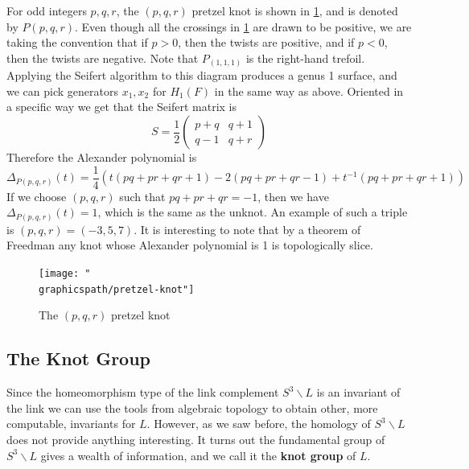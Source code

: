 \begin{example}
For odd integers $p,q,r$, the $(p,q,r)$ pretzel knot is shown in \cref{pretzel-knot}, and is denoted by $P(p,q,r)$. Even though all the crossings in \cref{pretzel-knot} are drawn to be positive, we are taking the convention that if $p>0$, then the twists are positive, and if $p<0$, then the twists are negative. Note that $P_{(1,1,1)}$ is the right-hand trefoil. Applying the Seifert algorithm to this diagram produces a genus 1 surface, and we can pick generators $x_1,x_2$ for $H_1(F)$ in the same way as above. Oriented in a specific way we get that the Seifert matrix is
\[ S = \frac{1}{2} \begin{pmatrix} p+q & q+1 \\ q-1 & q+r \end{pmatrix} \]
Therefore the Alexander polynomial is
\[ \Delta_{P(p,q,r)}(t) = \frac{1}{4} \left( t(pq+pr+qr+1) -2(pq+pr+qr-1) + t^{-1}(pq+pr+qr+1) \right) \]
If we choose $(p,q,r)$ such that $pq+pr+qr=-1$, then we have $\Delta_{P(p,q,r)}(t)=1$, which is the same as the unknot. An example of such a triple is $(p,q,r)=(-3,5,7)$. It is interesting to note that by a theorem of Freedman any knot whose Alexander polynomial is 1 is topologically slice.

\begin{figure}
\centering
\texttt{[image: "\\graphicspath/pretzel-knot"]}
\caption{The $(p,q,r)$ pretzel knot}
\label{pretzel-knot}
\end{figure}
\end{example}




\subsection{The Knot Group}
\label{The Knot Group}

Since the homeomorphism type of the link complement $S^3 \backslash L$ is an invariant of the link we can use the tools from algebraic topology to obtain other, more computable, invariants for $L$. However, as we saw before, the homology of $S^3 \backslash L$ does not provide anything interesting. It turns out the fundamental group of $S^3 \backslash L$ gives a wealth of information, and we call it the \textbf{knot group} of $L$. 


